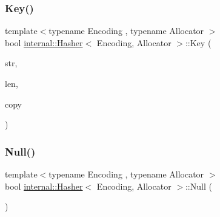 \mbox{\label{classinternal_1_1Hasher_a1b34d88f85f9c6a739c1f9038f14f078}} 
\subsubsection{\texorpdfstring{Key()}{Key()}}
{\footnotesize\ttfamily template$<$typename Encoding , typename Allocator $>$ \\
bool \hyperlink{classinternal_1_1Hasher}{internal\+::\+Hasher}$<$ Encoding, Allocator $>$\+::Key (\begin{DoxyParamCaption}\item[{const \hyperlink{classinternal_1_1Hasher_a415970af68a067615c3c95306cff6d43}{Ch} $\ast$}]{str,  }\item[{\hyperlink{rapidjson_8h_a5ed6e6e67250fadbd041127e6386dcb5}{Size\+Type}}]{len,  }\item[{bool}]{copy }\end{DoxyParamCaption})\hspace{0.3cm}{\ttfamily [inline]}}

\mbox{\label{classinternal_1_1Hasher_a57c656866aa08cc7c448ce47b7a243c3}} 
\subsubsection{\texorpdfstring{Null()}{Null()}}
{\footnotesize\ttfamily template$<$typename Encoding , typename Allocator $>$ \\
bool \hyperlink{classinternal_1_1Hasher}{internal\+::\+Hasher}$<$ Encoding, Allocator $>$\+::Null (\begin{DoxyParamCaption}{ }\end{DoxyParamCaption})\hspace{0.3cm}{\ttfamily [inline]}}

\mbox{\label{classinternal_1_1Hasher_ae277289ad2fb3a938a6507e566d3c5e2}} 
